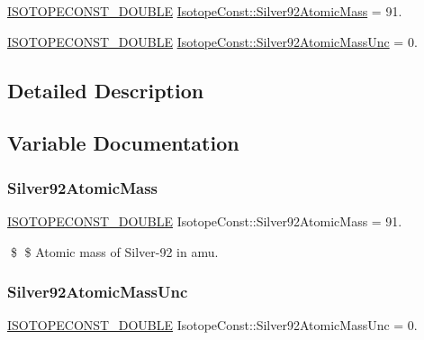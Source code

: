 \begin{DoxyCompactItemize}
\item 
\mbox{\hyperlink{group___isotope_const-_macros_ga8f45a7272ce02c0b4c65c44636ed719a}{I\+S\+O\+T\+O\+P\+E\+C\+O\+N\+S\+T\+\_\+\+D\+O\+U\+B\+LE}} \mbox{\hyperlink{group___isotope_const-_silver-_ag92_ga2b8683d2636c12bbcb475166a0fdb87c}{Isotope\+Const\+::\+Silver92\+Atomic\+Mass}} = 91.
\item 
\mbox{\hyperlink{group___isotope_const-_macros_ga8f45a7272ce02c0b4c65c44636ed719a}{I\+S\+O\+T\+O\+P\+E\+C\+O\+N\+S\+T\+\_\+\+D\+O\+U\+B\+LE}} \mbox{\hyperlink{group___isotope_const-_silver-_ag92_gac613295edd13813d6f8a2047b3314518}{Isotope\+Const\+::\+Silver92\+Atomic\+Mass\+Unc}} = 0.
\end{DoxyCompactItemize}


\subsection{Detailed Description}


\subsection{Variable Documentation}
\mbox{\label{group___isotope_const-_silver-_ag92_ga2b8683d2636c12bbcb475166a0fdb87c}} 
\subsubsection{\texorpdfstring{Silver92\+Atomic\+Mass}{Silver92AtomicMass}}
{\footnotesize\ttfamily \mbox{\hyperlink{group___isotope_const-_macros_ga8f45a7272ce02c0b4c65c44636ed719a}{I\+S\+O\+T\+O\+P\+E\+C\+O\+N\+S\+T\+\_\+\+D\+O\+U\+B\+LE}} Isotope\+Const\+::\+Silver92\+Atomic\+Mass = 91.}

\$ \$ Atomic mass of Silver-\/92 in amu. \mbox{\label{group___isotope_const-_silver-_ag92_gac613295edd13813d6f8a2047b3314518}} 
\subsubsection{\texorpdfstring{Silver92\+Atomic\+Mass\+Unc}{Silver92AtomicMassUnc}}
{\footnotesize\ttfamily \mbox{\hyperlink{group___isotope_const-_macros_ga8f45a7272ce02c0b4c65c44636ed719a}{I\+S\+O\+T\+O\+P\+E\+C\+O\+N\+S\+T\+\_\+\+D\+O\+U\+B\+LE}} Isotope\+Const\+::\+Silver92\+Atomic\+Mass\+Unc = 0.}

